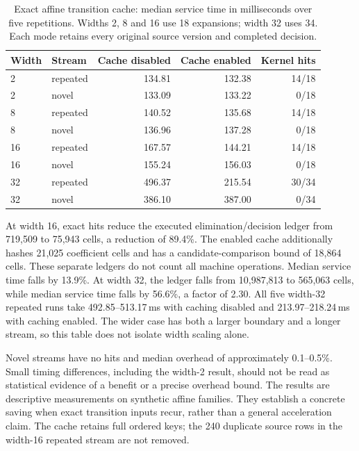 \documentclass[11pt,a4paper]{article}
\numberwithin{equation}{section}
\theoremstyle{plain}
\theoremstyle{definition}
\theoremstyle{remark}
\begin{document}
\begin{table}[ht]
\centering
\caption{Exact affine transition cache: median service time in milliseconds over five repetitions. Widths 2, 8 and 16 use 18 expansions; width 32 uses 34. Each mode retains every original source version and completed decision.}
\label{tab:affine-kernel-cache}
\begin{tabular}{llrrr}
\toprule
Width & Stream & Cache disabled & Cache enabled & Kernel hits\\
\midrule
2 & repeated & 134.81 & 132.38 & 14/18\\
2 & novel & 133.09 & 133.22 & 0/18\\
8 & repeated & 140.52 & 135.68 & 14/18\\
8 & novel & 136.96 & 137.28 & 0/18\\
16 & repeated & 167.57 & 144.21 & 14/18\\
16 & novel & 155.24 & 156.03 & 0/18\\
32 & repeated & 496.37 & 215.54 & 30/34\\
32 & novel & 386.10 & 387.00 & 0/34\\
\bottomrule
\end{tabular}
\end{table}

At width 16, exact hits reduce the executed elimination/decision ledger from 719,509 to 75,943 cells, a reduction of 89.4\%. The enabled cache additionally hashes 21,025 coefficient cells and has a candidate-comparison bound of 18,864 cells. These separate ledgers do not count all machine operations. Median service time falls by 13.9\%. At width 32, the ledger falls from 10,987,813 to 565,063 cells, while median service time falls by 56.6\%, a factor of 2.30. All five width-32 repeated runs take 492.85--513.17\,ms with caching disabled and 213.97--218.24\,ms with caching enabled. The wider case has both a larger boundary and a longer stream, so this table does not isolate width scaling alone.

Novel streams have no hits and median overhead of approximately 0.1--0.5\%. Small timing differences, including the width-2 result, should not be read as statistical evidence of a benefit or a precise overhead bound. The results are descriptive measurements on synthetic affine families. They establish a concrete saving when exact transition inputs recur, rather than a general acceleration claim. The cache retains full ordered keys; the 240 duplicate source rows in the width-16 repeated stream are not removed.
\end{document}
